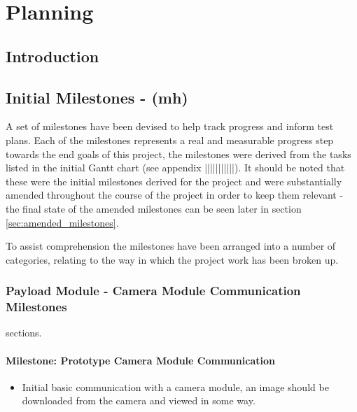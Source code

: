\chapter{Planning}

\section{Introduction}

\section{Initial Milestones - (mh)}
\label{sec:initial_milestones}
A set of milestones have been devised to help track progress and inform test plans.
Each of the milestones represents a real and measurable progress step towards the 
end goals of this project, the milestones were derived from the tasks listed in the initial
Gantt chart (see appendix |||||||||||). It should be noted that these were the initial
milestones derived for the project and were substantially amended throughout the course of
the project in order to keep them relevant - the final state of the amended milestones
can be seen later in section \ref{sec:amended_milestones}.

To assist comprehension the milestones have been arranged into a number of categories,
relating to the way in which the project work has been broken up.

\subsection{Payload Module - Camera Module Communication Milestones}
sections. 
	\subsubsection{Milestone: Prototype Camera Module Communication}
	\label{sec:ms_init_prototype_camera_module_comms}
		\begin{itemize}
			\item 	Initial basic communication with a camera module, an image should be
				downloaded from the camera and viewed in some way.
		\end{itemize}


